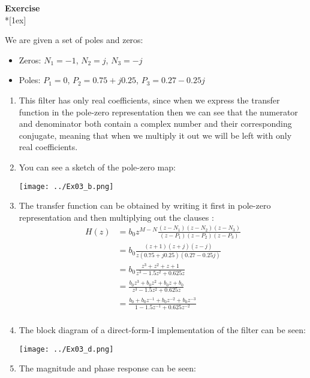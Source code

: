 \documentclass[12pt,a4paper,austrian]{article}
\newcounter{theaufgabe}\setcounter{theaufgabe}{1}
\newenvironment{aufgabe}[1]%
  {\bigskip\par\noindent\begin{nopagebreak}
   \textsf{\textbf{Exercise \arabic{theaufgabe}}}\quad
      \textsf{\textit{#1}}\\*[1ex]%
\stepcounter{theaufgabe}\hspace{2ex}\end{nopagebreak}}
  {\par\pagebreak[2]}
\begin{document}
\begin{aufgabe}{} %

  We are given a set of poles and zeros:
  \begin{itemize}
    \item Zeros: $N_1 = -1$, $N_2 = j$, $N_3 = -j$
    \item Poles: $P_1 = 0$, $P_2 = 0.75 + j0.25$, $P_3 = 0.27 - 0.25j$
  \end{itemize}

  \begin{enumerate}
    \item This filter has only real coefficients, since when we express the transfer function in the pole-zero representation then we can see that the numerator and denominator both contain a complex number and their corresponding conjugate, meaning that when we multiply it out we will be left with only real coefficients.

    \item You can see a sketch of the pole-zero map:
    \begin{center}
      \texttt{[image: ../Ex03\_b.png]}
    \end{center}

    \item The transfer function can be obtained by writing it first in pole-zero representation and then multiplying out the clauses :
    \begin{align}
      H(z)
      &= b_0 z^{M-N} \frac{(z-N_1)(z-N_2)(z-N_3)}{(z-P_1)(z-P_2)(z-P_3)} \\
      &= b_0 \frac{(z+1)(z+j)(z-j)}{z(0.75+j0.25)(0.27-0.25j)} \\
      &= b_0 \frac{z^3 + z^2 + z + 1}{z^3 - 1.5z^2 + 0.625z} \\
      &= \frac{b_0z^3 + b_0z^2 + b_0z + b_0}{z^3 - 1.5z^2 + 0.625z} \\
      &= \frac{b_0 + b_0z^{-1} + b_0z^{-2} + b_0z^{-3}}{1 - 1.5z^{-1} + 0.625z^{-2}} \\
    \end{align}

    \item The block diagram of a direct-form-I implementation of the filter can be seen:
    \begin{center}
      \texttt{[image: ../Ex03\_d.png]}
    \end{center}

    \item The magnitude and phase response can be seen:
    

\end{enumerate}
\end{aufgabe}
\end{document}
